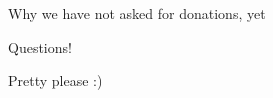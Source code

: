 	\begin{frame}{Why we have not asked for donations, yet}
 		\begin{center}Questions!\end{center}
 		\begin{center}Pretty please :)\end{center}
	\end{frame}

% 
% 
% 
% 
% 
